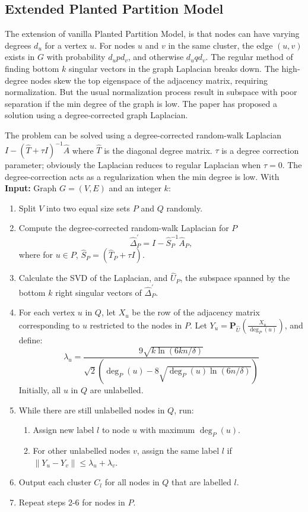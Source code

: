 {	\subsection{Extended Planted Partition Model}
	
	The extension of vanilla Planted Partition Model, is that nodes can have varying degrees $d_u$ for a vertex $u$. For nodes $u$ and $v$ in the same cluster, the edge $(u,v)$ exists in $G$ with probability $d_u p d_v$, and otherwise $d_u q d_v$. The regular method of finding bottom $k$ singular vectors in the graph Laplacian breaks down. The high-degree nodes skew the top eigenspace of the adjacency matrix, requiring normalization. But the usual normalization process result in subspace with poor separation if the min degree of the graph is low. The paper \cite{chau12} has proposed a solution using a degree-corrected graph Laplacian.
	
	The problem can be solved using a degree-corrected random-walk Laplacian $I-(\hat{T}+\tau I)^{-1} \hat{A}$ where $\hat{T}$ is the diagonal degree matrix. $\tau$ is a degree correction parameter; obviously the Laplacian reduces to regular Laplacian when $\tau=0$. The degree-correction acts as a regularization when the min degree is low. With \textbf{Input:} Graph $G = (V, E)$ and an integer $k$:
	
	\begin{enumerate}
		\item Split $V$ into two equal size sets $P$ and $Q$ randomly.
		\item Compute the degree-corrected random-walk Laplacian for $P$
			\[\hat{\Delta}_{P}^{\prime}=I-\hat{S}_{P}^{-1} \hat{A}_{P},\]
			where for $u \in P$, $\hat{S}_{P}=\left(\hat{T}_{P}+\tau I\right)$.
		\item Calculate the SVD of the Laplacian, and $\hat{U}_P$, the subspace spanned by the bottom $k$ right singular vectors of $\hat{\Delta}_{P}^{\prime}$.
		\item For each vertex $u$ in $Q$, let $X_{u}$ be the row of the adjacency matrix corresponding to $u$ restricted to the nodes in $P .$ Let $Y_{u}=\mathbf{P}_{\hat{U}}\left(\frac{X_{u}}{\operatorname{deg}_{P}(u)}\right)$, and define:
			\[\lambda_{u}=\frac{9 \sqrt{k \ln (6 k n / \delta)}}{\sqrt{2}\left(\operatorname{deg}_{P}(u)-8 \sqrt{\operatorname{deg}_{P}(u) \ln (6 n / \delta)}\right)}\]
			Initially, all $u$ in $Q$ are unlabelled.
		\item While there are still unlabelled nodes in $Q$, run:
		\begin{enumerate}
			\item Assign new label $l$ to node $u$ with maximum $\operatorname{deg}_{P}(u)$.
			\item For other unlabelled nodes $v$, assign the same label $l$ if $\| Y_u - Y_v \| \leq \lambda_u + \lambda_v$.
		\end{enumerate}
		\item Output each cluster $C_l$ for all nodes in $Q$ that are labelled $l$.
		\item Repeat steps 2-6 for nodes in $P$.
	\end{enumerate}
	
}
